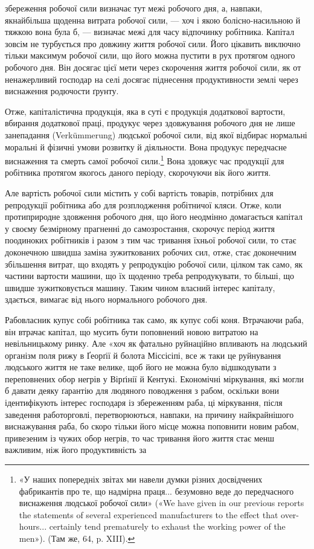 збереження робочої сили визначає тут межі робочого дня, а,
навпаки, якнайбільша щоденна витрата робочої сили, — хоч і
якою болісно-насильною й тяжкою вона була б, — визначає
межі для часу відпочинку робітника. Капітал зовсім не турбується
про довжину життя робочої сили. Його цікавить виключно тільки
максимум робочої сили, що його можна пустити в рух протягом
одного робочого дня. Він досягає цієї мети через скорочення життя
робочої сили, як от ненажерливий господар на селі досягає піднесення
продуктивности землі через виснаження родючости ґрунту.

Отже, капіталістична продукція, яка в суті є продукція додаткової
вартости, вбирання додаткової праці, продукує через
здовжування робочого дня не лише занепадання (Verkümmerung)
людської робочої сили, від якої відбирає нормальні моральні й
фізичні умови розвитку й діяльности. Вона продукує передчасне
виснаження та смерть самої робочої сили.\footnote{
«У наших попередніх звітах ми навели думки різних досвідчених
фабрикантів про те, що надмірна праця... безумовно веде до передчасного
виснаження людської робочої сили» («We have given in our previous
reports the statements of several experienced manufacturers to the effect
that over-hours... certainly tend prematurely to exhaust the working
power of the men»). (Там же, 64, p. XIII).
} Вона здовжує
час продукції для робітника протягом якогось даного періоду,
скорочуючи вік його життя.

Але вартість робочої сили містить у собі вартість товарів,
потрібних для репродукції робітника або для розплодження
робітничої кляси. Отже, коли протиприродне здовження робочого
дня, що його неодмінно домагається капітал у своєму безмірному
прагненні до самозростання, скорочує період життя поодиноких
робітників і разом з тим час тривання їхньої робочої сили, то
стає доконечною швидша заміна зужиткованих робочих сил, отже,
стає доконечним збільшення витрат, що входять у репродукцію
робочої сили, цілком так само, як частини вартости машини, що
їх щоденно треба репродукувати, то більші, що швидше зужитковується
машину. Таким чином власний інтерес капіталу, здається,
вимагає від нього нормального робочого дня.

Рабовласник купує собі робітника так само, як купує собі
коня. Втрачаючи раба, він втрачає капітал, що мусить бути поповнений
новою витратою на невільницькому ринку. Але «хоч
як фатально руйнаційно впливають на людський організм поля
рижу в Ґеорґії й болота Міссісіпі, все ж таки це руйнування людського
життя не таке велике, щоб його не можна було відшкодувати
з переповнених обор негрів у Вірґінії й Кентукі. Економічні
міркування, які могли б давати деяку ґарантію для людяного
поводження з рабом, оскільки вони ідентифікують інтерес господаря
із збереженням раба, ці міркування, після заведення работорговлі,
перетворюються, навпаки, на причину найкрайнішого
виснажування раба, бо скоро тільки його місце можна поповнити
новим рабом, привезеним із чужих обор негрів, то час тривання
його життя стає менш важливим, ніж його продуктивність за